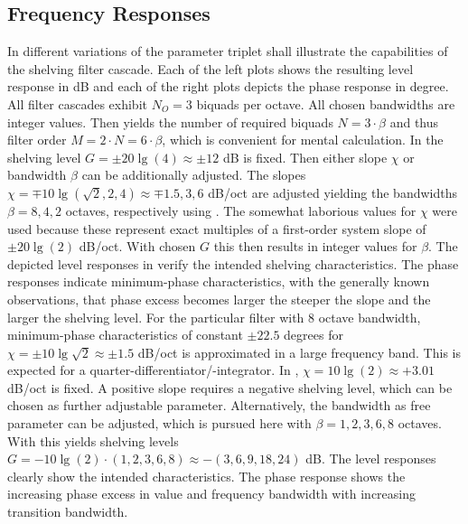 \subsection{Frequency Responses}
%
In  different variations of the
parameter triplet shall illustrate the capabilities of the shelving filter
cascade.
%
Each of the left plots shows the resulting level response in dB and each of
the right plots depicts the phase response in degree.
%
All filter cascades exhibit $N_O = 3$ biquads per octave.
All chosen bandwidths are integer values.
Then  yields the number of required biquads
$N = 3\cdot\beta$ and thus filter order $M=2 \cdot N=6\cdot\beta$,
which is convenient for mental calculation.
%
%
%
\NewL In  the shelving level
$G=\pm 20 \lg (4) \approx \pm 12$ dB is fixed.
%
Then either slope $\chi$ or bandwidth $\beta$ can be additionally adjusted.
%
The slopes $\chi = \mp 10 \lg (\sqrt{2}, 2, 4) \approx \mp 1.5, 3, 6$
dB/oct are adjusted
yielding the bandwidths $\beta = 8,4,2$ octaves, respectively using .
%
The somewhat laborious values for $\chi$ were used
because these represent exact
multiples of a first-order system slope of $\pm 20 \lg(2)$ dB/oct.
With chosen $G$ this then results in integer values
for $\beta$.
%
The depicted level responses in
 verify the intended shelving
characteristics.
%
The phase responses indicate minimum-phase characteristics, with
the generally known observations, that phase excess becomes larger the steeper
the slope and the larger the shelving level.
%
For the particular filter with 8 octave bandwidth,
minimum-phase characteristics of constant $\pm22.5$ degrees for
$\chi = \pm 10 \lg\sqrt{2} \approx \pm 1.5$ dB/oct is approximated in a large
frequency band.
%
This is expected for a quarter-differentiator/-integrator.
%
%
%
\NewL In ,
$\chi = 10\lg(2)\approx +3.01$ dB/oct is fixed.
%
A positive slope requires a negative shelving level, which can be chosen as
further adjustable parameter.
%
Alternatively, the bandwidth as free parameter can be adjusted, which is pursued
here with $\beta = 1,2,3,6,8$ octaves.
%
With  this yields shelving levels
$G = - 10\lg(2)\cdot (1,2,3,6,8)\approx -(3,6,9,18,24)$ dB.
%
The level responses clearly show the intended characteristics.
%
The phase response shows the increasing phase excess in value and frequency
bandwidth with increasing transition bandwidth.

